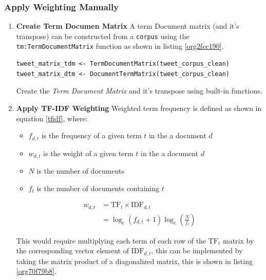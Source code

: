 \documentclass[11pt]{article}
\begin{document}
\subsubsection{Apply Weighting Manually}
\label{sec:org399b6d9}
\begin{enumerate}
\item \textbf{Create Term Documen Matrix}
\label{sec:orgd9d2a65}
\newline
A term Document matrix (and it's transpose) can be constructed from a \texttt{corpus} using the
\texttt{tm:TermDocumentMatrix} function as shown in listing \ref{org2fcc190}.

\begin{listing}[htbp]
\begin{verbatim}
tweet_matrix_tdm <- TermDocumentMatrix(tweet_corpus_clean)
tweet_matrix_dtm <- DocumentTermMatrix(tweet_corpus_clean)
\end{verbatim}
\caption{\label{org2fcc190}Create the \emph{Term Document Matrix} and it's transpose using built-in functions.}
\end{listing}

\item \textbf{Apply TF-IDF Weighting}
\label{sec:orge3faf61}
\newline
Weighted term frequency is defined as shown in equation \eqref{tfidf}, where:

\begin{itemize}
\item \(f_{d,t}\) is the frequency of a given term \(t\) in the a document \(d\)
\item \(w_{d,t}\) is the weight of a given term \(t\) in the a document \(d\)
\item \(N\) is the number of documents
\item \(f_{t}\) is the number of documents containing \(t\)
\end{itemize}

\begin{equation}\begin{aligned}
w_{d, t} &=\mathrm{TF}_{t} \times \mathrm{IDF}_{d, t} \\
&=\log _{e}\left(f_{d, t}+1\right) \log _{e}\left(\frac{N}{f_{t}}\right) \label{tfidf}
\end{aligned}\end{equation}

This would require multiplying each term of each row of the \(\mathrm{TF}_{t}\) matrix by the corresponding vector element of \(\mathrm{IDF}_{d,t}\), this can be implemented by taking the matrix product of a diagonalized matrix, this is shown in listing \ref{org70f79b8}.


\end{enumerate}
\end{document}

